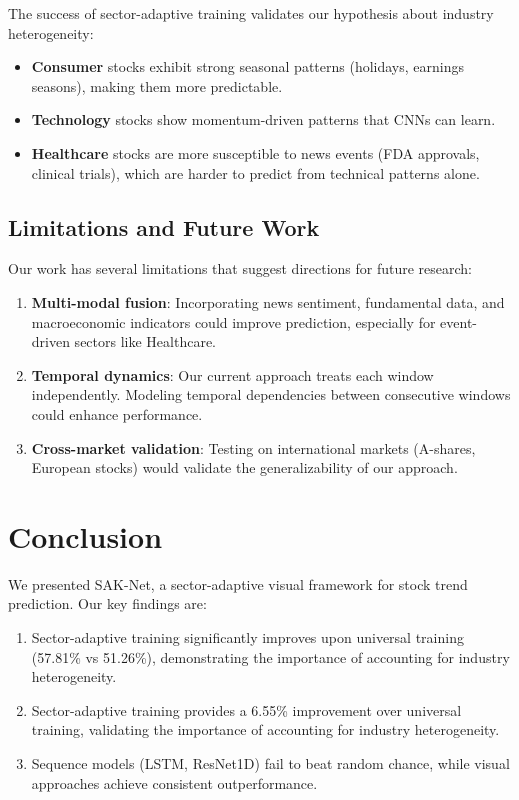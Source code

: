 \documentclass[runningheads]{llncs}
\begin{document}
The success of sector-adaptive training validates our hypothesis about industry heterogeneity:

\begin{itemize}
    \item \textbf{Consumer} stocks exhibit strong seasonal patterns (holidays, earnings seasons), making them more predictable.
    \item \textbf{Technology} stocks show momentum-driven patterns that CNNs can learn.
    \item \textbf{Healthcare} stocks are more susceptible to news events (FDA approvals, clinical trials), which are harder to predict from technical patterns alone.
\end{itemize}

\subsection{Limitations and Future Work}
\label{sec:limitations}

Our work has several limitations that suggest directions for future research:

\begin{enumerate}
    \item \textbf{Multi-modal fusion}: Incorporating news sentiment, fundamental data, and macroeconomic indicators could improve prediction, especially for event-driven sectors like Healthcare.
    \item \textbf{Temporal dynamics}: Our current approach treats each window independently. Modeling temporal dependencies between consecutive windows could enhance performance.
    \item \textbf{Cross-market validation}: Testing on international markets (A-shares, European stocks) would validate the generalizability of our approach.
\end{enumerate}


\section{Conclusion}
\label{sec:conclusion}

We presented SAK-Net, a sector-adaptive visual framework for stock trend prediction. Our key findings are:

\begin{enumerate}
    \item Sector-adaptive training significantly improves upon universal training (57.81\% vs 51.26\%), demonstrating the importance of accounting for industry heterogeneity.
    \item Sector-adaptive training provides a 6.55\% improvement over universal training, validating the importance of accounting for industry heterogeneity.
    \item Sequence models (LSTM, ResNet1D) fail to beat random chance, while visual approaches achieve consistent outperformance.
\end{enumerate}
\end{document}
